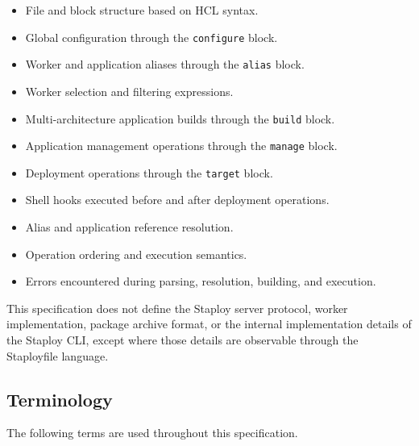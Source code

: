 \documentclass[11pt,a4paper]{article}
\begin{document}
    \begin{itemize}
        \item File and block structure based on HCL syntax.
        \item Global configuration through the \texttt{configure} block.
        \item Worker and application aliases through the \texttt{alias} block.
        \item Worker selection and filtering expressions.
        \item Multi-architecture application builds through the \texttt{build} block.
        \item Application management operations through the \texttt{manage} block.
        \item Deployment operations through the \texttt{target} block.
        \item Shell hooks executed before and after deployment operations.
        \item Alias and application reference resolution.
        \item Operation ordering and execution semantics.
        \item Errors encountered during parsing, resolution, building, and execution.
    \end{itemize}

    This specification does not define the Staploy server protocol, worker
    implementation, package archive format, or the internal implementation
    details of the Staploy CLI, except where those details are observable
    through the Staployfile language.

    \subsection{Terminology}\label{subsec:terminology}

    The following terms are used throughout this specification.
\end{document}
